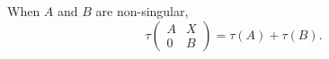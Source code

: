 When $A$ and $B$ are non-singular,
$$\tau \begin{pmatrix} A & X \\ 0 & B \end{pmatrix} = \tau(A) + \tau(B).$$
